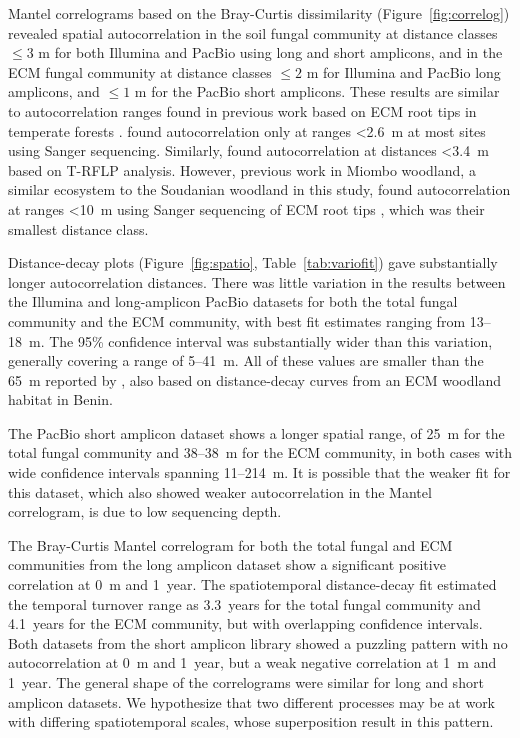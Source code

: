 \documentclass[
  12pt,
]{article}
\begin{document}
Mantel correlograms based on the Bray-Curtis dissimilarity (Figure~\ref{fig:correlog}) revealed spatial autocorrelation in the soil fungal community at distance classes \(\le 3\) m for both Illumina and PacBio using long and short amplicons, and in the ECM fungal community at distance classes \(\le 2\) m for Illumina and PacBio long amplicons, and \(\le 1\) m for the PacBio short amplicons.
These results are similar to autocorrelation ranges found in previous work based on ECM root tips in temperate forests \autocite{lilleskov2004,pickles2012a}.
\textcite{lilleskov2004} found autocorrelation only at ranges \textless2.6~m at most sites using Sanger sequencing.
Similarly, \textcite{pickles2012a} found autocorrelation at distances \textless3.4~m based on T-RFLP analysis.
However, previous work in Miombo woodland, a similar ecosystem to the Soudanian woodland in this study, found autocorrelation at ranges \textless10~m using Sanger sequencing of ECM root tips \autocite{tedersoo2011}, which was their smallest distance class.

Distance-decay plots (Figure~\ref{fig:spatio}, Table~\ref{tab:variofit}) gave substantially longer autocorrelation distances.
There was little variation in the results between the Illumina and long-amplicon PacBio datasets for both the total fungal community and the ECM community, with best fit estimates ranging from 13--18~m.
The 95\% confidence interval was substantially wider than this variation, generally covering a range of 5--41~m.
All of these values are smaller than the 65~m reported by \textcite{Bahram2013}, also based on distance-decay curves from an ECM woodland habitat in Benin.

The PacBio short amplicon dataset shows a longer spatial range, of 25~m for the total fungal community and 38--38~m for the ECM community, in both cases with wide confidence intervals spanning 11--214~m.
It is possible that the weaker fit for this dataset, which also showed weaker autocorrelation in the Mantel correlogram, is due to low sequencing depth.

The Bray-Curtis Mantel correlogram for both the total fungal and ECM communities from the long amplicon dataset show a significant positive correlation at 0~m and 1~year.
The spatiotemporal distance-decay fit estimated the temporal turnover range as 3.3~years for the total fungal community and 4.1~years for the ECM community, but with overlapping confidence intervals.
Both datasets from the short amplicon library showed a puzzling pattern with no autocorrelation at 0~m and 1~year, but a weak negative correlation at 1~m and 1~year.
The general shape of the correlograms were similar for long and short amplicon datasets.
We hypothesize that two different processes may be at work with differing spatiotemporal scales, whose superposition result in this pattern.
\end{document}
